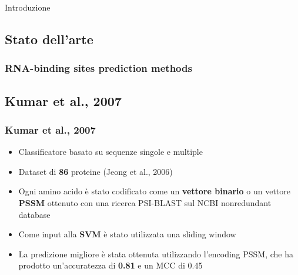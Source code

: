 \documentclass{beamer}
\begin{document}
\begin{section}{Introduzione}
\subsection{Stato dell'arte}
\begin{frame}
\frametitle{RNA-binding sites prediction methods}
\end{frame}

\subsection{Kumar et al., 2007}
\begin{frame}
\frametitle{Kumar et al., 2007}
\begin{itemize}
\item Classificatore basato su sequenze singole e multiple
\item Dataset di \textbf{86} proteine (Jeong et al., 2006)
\item Ogni amino acido \`{e} stato codificato come un \textbf{vettore binario} o un vettore \textbf{PSSM} ottenuto con una ricerca PSI-BLAST sul NCBI nonredundant database
\item Come input alla \textbf{SVM} \`{e} stato utilizzata una sliding window
\item La predizione migliore \`{e} stata ottenuta utilizzando l'encoding PSSM, che ha prodotto un'accuratezza di \textbf{0.81} e un MCC di 0.45 
\end{itemize}
\end{frame}
\end{section}
\end{document}
